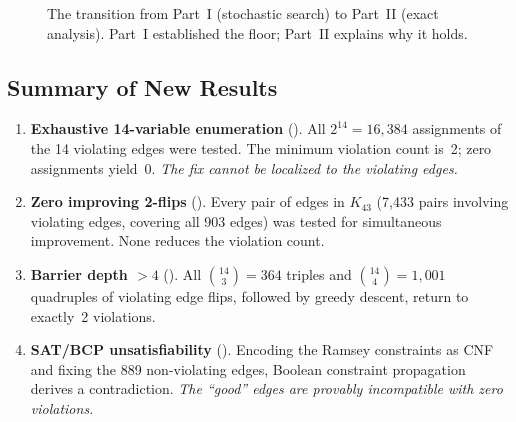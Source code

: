 \documentclass[11pt,a4paper]{article}
\theoremstyle{plain}
\theoremstyle{remark}
\begin{document}
\begin{figure}[H]
\centering
{}
\caption{The transition from Part~I (stochastic search) to Part~II
  (exact analysis). Part~I established the floor; Part~II explains
  why it holds.}
\label{fig:approach}
\end{figure}

\subsection{Summary of New Results}

\begin{enumerate}[leftmargin=2em]
  \item \textbf{Exhaustive 14-variable enumeration} ().
    All $2^{14} = 16{,}384$ assignments of the 14 violating edges
    were tested. The minimum violation count is~2; zero assignments
    yield~0. \emph{The fix cannot be localized to the violating edges.}

  \item \textbf{Zero improving 2-flips} ().
    Every pair of edges in $K_{43}$ (7{,}433 pairs involving violating
    edges, covering all 903 edges) was tested for simultaneous
    improvement. None reduces the violation count.

  \item \textbf{Barrier depth $> 4$} ().
    All $\binom{14}{3} = 364$ triples and $\binom{14}{4} = 1{,}001$
    quadruples of violating edge flips, followed by greedy descent,
    return to exactly~2 violations.

  \item \textbf{SAT/BCP unsatisfiability} ().
    Encoding the Ramsey constraints as CNF and fixing the 889
    non-violating edges, Boolean constraint propagation derives a
    contradiction. \emph{The ``good'' edges are provably incompatible
    with zero violations.}
\end{enumerate}
\end{document}
